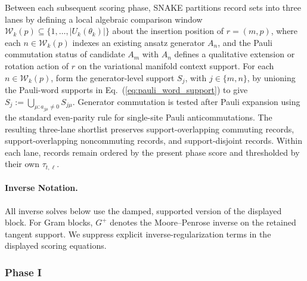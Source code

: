 \documentclass[
  reprint,
  amsmath,
  amssymb,
  aps,
  pra,
  nofootinbib,
  superscriptaddress,
  floatfix
]{revtex4-2}
\begin{document}
Between each subsequent scoring phase, SNAKE partitions record sets into three lanes by defining a local algebraic comparison window $\mathcal W_k(p)\subseteq\{1,\ldots,|U_k(\theta_k)|\}$ about the insertion position of $r=(m,p)$, where each $n\in\mathcal W_k(p)$ indexes an existing ansatz generator $A_n$, and the Pauli commutation status of candidate $A_m$ with $A_n$ defines a qualitative extension or rotation action of $r$ on the variational manifold context support.
For each $n\in\mathcal W_k(p)$, form the generator-level support $S_j$, with $j\in\{m,n\}$, by unioning the Pauli-word supports in Eq.~(\ref{eq:pauli_word_support}) to give
$S_j:=\bigcup_{\mu:a_{j\mu}\ne0}S_{j\mu}$.
Generator commutation is tested after Pauli expansion using the standard even-parity rule for single-site Pauli anticommutations. The resulting three-lane shortlist preserves support-overlapping commuting records, support-overlapping noncommuting records, and support-disjoint records. Within each lane, records remain ordered by the present phase score and thresholded by their own $\tau_{t,\ell}$.

\paragraph*{Inverse Notation.}
All inverse solves below use the damped, supported version of the displayed block. For Gram blocks, \(G^+\) denotes the Moore--Penrose inverse on the retained tangent support. We suppress explicit inverse-regularization terms in the displayed scoring equations.

\subsubsection{Phase I}
\end{document}
